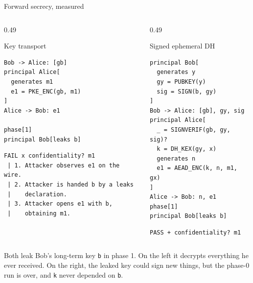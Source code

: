 \ifdefined\PRESENTATION\else\PassOptionsToClass{handout}{beamer}\fi\documentclass[aspectratio=169, lualatex]{beamer}
\newcommand{\vpcode}{\fontsize{6}{6.4}\selectfont\ttfamily\color{vpink}}
\begin{document}
\begin{frame}[fragile]{Forward secrecy, measured}
	\begin{columns}[t]
		\begin{column}{0.49\textwidth}
			\begin{vpmodel}{Key transport}
				\begin{lstlisting}[basicstyle=\vpcode]
Bob -> Alice: [gb]
principal Alice[
  generates m1
  e1 = PKE_ENC(gb, m1)
]
Alice -> Bob: e1

phase[1]
principal Bob[leaks b]
\end{lstlisting}
			\end{vpmodel}
			\vspace{0.3em}
			\begin{vpresult}{}
				\begin{lstlisting}[basicstyle=\vpcode]
FAIL x confidentiality? m1
 | 1. Attacker observes e1 on the wire.
 | 2. Attacker is handed b by a leaks
 |    declaration.
 | 3. Attacker opens e1 with b,
 |    obtaining m1.
\end{lstlisting}
			\end{vpresult}
		\end{column}
		\begin{column}{0.49\textwidth}
			\begin{vpmodel}{Signed ephemeral DH}
				\begin{lstlisting}[basicstyle=\vpcode]
principal Bob[
  generates y
  gy = PUBKEY(y)
  sig = SIGN(b, gy)
]
Bob -> Alice: [gb], gy, sig
principal Alice[
  _ = SIGNVERIF(gb, gy, sig)?
  k = DH_KEX(gy, x)
  generates n
  e1 = AEAD_ENC(k, n, m1, gx)
]
Alice -> Bob: n, e1
phase[1]
principal Bob[leaks b]
\end{lstlisting}
			\end{vpmodel}
			\vspace{0.3em}
			\begin{vpresult}{}
				\begin{lstlisting}[basicstyle=\vpcode]
PASS + confidentiality? m1
\end{lstlisting}
			\end{vpresult}
		\end{column}
	\end{columns}
	\begin{center}
		\scriptsize Both leak Bob's long-term key \texttt{b} in phase 1. On the left it decrypts everything he ever received. On the right, the leaked key could sign new things, but the phase-0 run is over, and \texttt{k} never depended on \texttt{b}.
	\end{center}
\end{frame}
\end{document}
